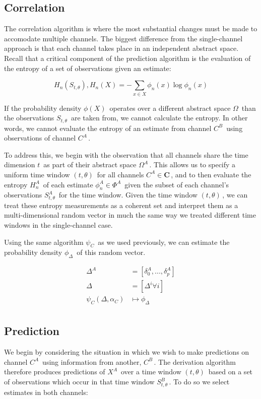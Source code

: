 \documentclass[10pt]{article}
\begin{document}
\subsection{Correlation}
The correlation algorithm is where the most substantial changes must be made to accomodate multiple channels.  The biggest difference from the single-channel approach is that each channel takes place in an independent abstract space.  Recall that a critical component of the prediction algorithm is the evaluation of the entropy of a set of observations given an estimate:

\[ H_n(S_{t,\theta}), H_n(X) = -\sum_{x \in X} \phi_n(x) \log \phi_n(x) \]

If the probability density \(\phi(X) \,\!\) operates over a different abstract space \(\Omega \,\!\) than the observations \(S_{t,\theta} \,\!\) are taken from, we cannot calculate the entropy.  In other words, we cannot evaluate the entropy of an estimate from channel \(C^B \,\!\) using observations of channel \(C^A \,\!\).  

To address this, we begin with the observation that all channels share the time dimension \(t \,\!\) as part of their abstract space \(\Omega^A \,\!\).  This allows us to specify a uniform time window \((t,\theta) \,\!\) for all channels \(C^A \in \mathbf{C} \,\!\), and to then evaluate the entropy \(H_n^A \,\!\) of each estimate \(\phi_n^A \in \Phi^A \,\!\) given the subset of each channel's observations \(S_{t,\theta}^A \,\!\) for the time window.  Given the time window \((t,\theta) \,\!\), we can treat these entropy measurements as a coherent set and interpret them as a multi-dimensional random vector in much the same way we treated different time windows in the single-channel case.

Using the same algorithm \(\psi_C \,\!\) as we used previously, we can estimate the probability density \(\phi_\Delta \,\!\) of this random vector. 

\begin{align*}
\Delta^A &= [\delta_0^A,...,\delta_p^A] \\
\Delta &= [\Delta^i \forall i] \\
\psi_C( \Delta , \alpha_C ) &\mapsto \phi_\Delta \\
\end{align*}

\subsection{Prediction}
We begin by considering the situation in which we wish to make predictions on channel \(C^A \,\!\) using information from another, \(C^B \,\!\).  The derivation algorithm therefore produces predictions of \(X^A \,\!\) over a time window \((t,\theta) \,\!\) based on a set of observations which occur in that time window \(S_{t,\theta}^B \,\!\).  To do so we select estimates in both channels:
\end{document}
